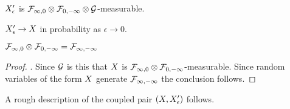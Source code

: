 {\begin{obs}
  $X'_{\epsilon}$ is $\mathcal{F}_{\infty,0} \otimes \mathcal{F}_{0,-\infty} \otimes \mathcal{G}$-measurable.
\end{obs}

\begin{lemma}
  $X'_{\epsilon} \to X$ in probability as $\epsilon \to 0$.
\end{lemma}

\begin{theorem}
  $\mathcal{F}_{\infty,0} \otimes \mathcal{F}_{0,-\infty} = \mathcal{F}_{\infty,-\infty}$
\end{theorem}

\begin{proof}
  .
  Since $\mathcal{G}$ is
 this  that $X$ is $\mathcal{F}_{\infty,0} \otimes \mathcal{F}_{0,-\infty}$-measurable.
Since random variables of the form $X$ generate
$\mathcal{F}_{\infty,-\infty}$ the conclusion follows.
\end{proof}

\begin{obs}
  \label{obs:2d-proc}
  A rough description of the coupled pair $(X, X'_{\epsilon})$
  follows.

  \FIXME{}{}
\end{obs}
}
